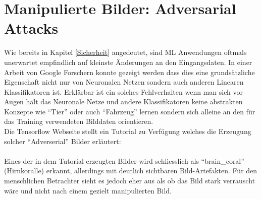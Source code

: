 \documentclass[
  12pt, %
  a4paper, %
  oneside, %
  openany, 
  numbers=noenddot, %
  BCOR=5mm, %
  parskip=half*, %
  thesis, %
]{bfhbook}
\begin{document}
\section{Manipulierte Bilder: Adversarial Attacks}
Wie bereits in Kapitel \ref{Sicherheit} angedeutet, sind \Gls{ML} Anwendungen oftmals unerwartet empfindlich auf kleinste Änderungen an den Eingangsdaten. In einer Arbeit von Google Forschern   \parencite{Goodfellow2014} konnte gezeigt werden dass dies eine grundsätzliche Eigenschaft nicht nur von Neuronalen Netzen sondern auch anderen Linearen Klassifikatoren ist. Erklärbar ist ein solches Fehlverhalten wenn man sich vor Augen hält das Neuronale Netze und andere Klassifikatoren keine abstrakten Konzepte wie ``Tier'' oder auch ``Fahrzeug'' lernen sondern sich alleine an den für das Training verwendeten Bilddaten orientieren.\\
Die Tensorflow Webseite stellt ein Tutorial zu Verfügung welches die Erzeugung solcher ``Adverserial'' Bilder erläutert: \parencite{tensorflowFGSM}
\\ 
\\
Eines der in dem Tutorial erzeugten Bilder wird schliesslich als ``brain\_coral'' (Hirnkoralle) erkannt, allerdings mit deutlich sichtbaren Bild-Artefakten. Für den menschlichen Betrachter sieht es jedoch eher aus als ob das Bild stark verrauscht wäre und nicht nach einem gezielt manipulierten Bild.
\end{document}
